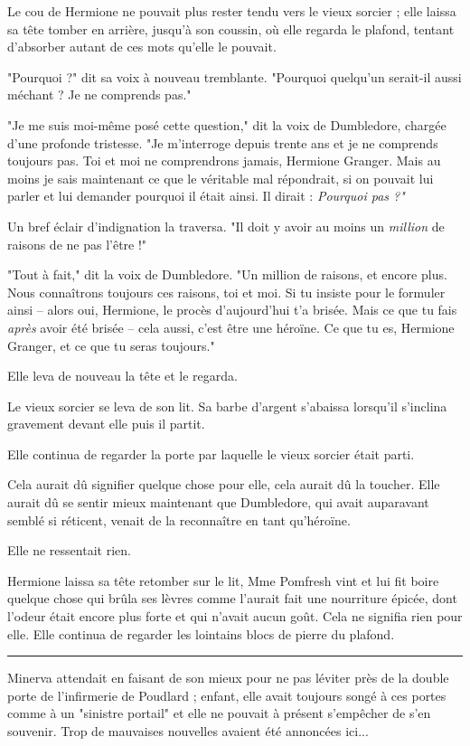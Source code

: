 Le cou de Hermione ne pouvait plus rester tendu vers le vieux sorcier ; elle laissa sa tête tomber en arrière, jusqu'à son coussin, où elle regarda le plafond, tentant d'absorber autant de ces mots qu'elle le pouvait.

"Pourquoi ?" dit sa voix à nouveau tremblante. "Pourquoi quelqu'un serait-il aussi méchant ? Je ne comprends pas."

"Je me suis moi-même posé cette question," dit la voix de Dumbledore, chargée d'une profonde tristesse. "Je m'interroge depuis trente ans et je ne comprends toujours pas. Toi et moi ne comprendrons jamais, Hermione Granger. Mais au moins je sais maintenant ce que le véritable mal répondrait, si on pouvait lui parler et lui demander pourquoi il était ainsi. Il dirait : \emph{Pourquoi pas ?"} 

Un bref éclair d'indignation la traversa. "Il doit y avoir au moins un \emph{million}  de raisons de ne pas l'être !"

"Tout à fait," dit la voix de Dumbledore. "Un million de raisons, et encore plus. Nous connaîtrons toujours ces raisons, toi et moi. Si tu insiste pour le formuler ainsi – alors oui, Hermione, le procès d'aujourd'hui t'a brisée. Mais ce que tu fais \emph{après}  avoir été brisée – cela aussi, c'est être une héroïne. Ce que tu es, Hermione Granger, et ce que tu seras toujours."

Elle leva de nouveau la tête et le regarda.

Le vieux sorcier se leva de son lit. Sa barbe d'argent s'abaissa lorsqu'il s'inclina gravement devant elle puis il partit.

Elle continua de regarder la porte par laquelle le vieux sorcier était parti.

Cela aurait dû signifier quelque chose pour elle, cela aurait dû la toucher. Elle aurait dû se sentir mieux maintenant que Dumbledore, qui avait auparavant semblé si réticent, venait de la reconnaître en tant qu'héroïne.

Elle ne ressentait rien.

Hermione laissa sa tête retomber sur le lit, Mme Pomfresh vint et lui fit boire quelque chose qui brûla ses lèvres comme l'aurait fait une nourriture épicée, dont l'odeur était encore plus forte et qui n'avait aucun goût. Cela ne signifia rien pour elle. Elle continua de regarder les lointains blocs de pierre du plafond.
\par\noindent\rule{\textwidth}{0.4pt}
Minerva attendait en faisant de son mieux pour ne pas léviter près de la double porte de l'infirmerie de Poudlard ; enfant, elle avait toujours songé à ces portes comme à un "sinistre portail" et elle ne pouvait à présent s'empêcher de s'en souvenir. Trop de mauvaises nouvelles avaient été annoncées ici...

